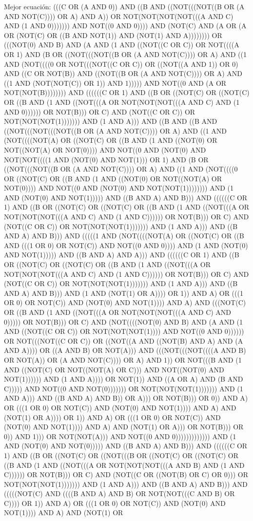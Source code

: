 Mejor ecuación: (((C OR (A AND 0)) AND ((B AND ((NOT(((NOT((B OR (A AND NOT(C)))) OR A) AND A)) OR NOT(NOT(NOT(NOT(((A AND C) AND (1 AND 0))))))) AND NOT((0 AND 0)))) AND (NOT(C) AND (A OR (A OR (NOT(C) OR ((B AND NOT(1)) AND (NOT(1) AND A)))))))) OR (((NOT(0) AND B) AND (A AND (1 AND ((NOT((C OR C)) OR NOT((((A OR 1) AND (B OR ((NOT(((NOT((B OR (A AND NOT(C)))) OR A) AND ((1 AND (NOT((((0 OR NOT(((NOT((C OR C)) OR ((NOT((A AND 1)) OR 0) AND ((C OR NOT(B)) AND ((NOT((B OR (A AND NOT(C)))) OR A) AND ((1 AND (NOT(NOT(C)) OR 1)) AND 1))))) AND NOT((0 AND (A OR NOT(NOT(B)))))))) AND ((((((C OR 1) AND ((B OR ((NOT(C) OR ((NOT(C) OR ((B AND (1 AND ((NOT(((A OR NOT(NOT(NOT(((A AND C) AND (1 AND 0)))))) OR NOT(B))) OR C) AND (NOT((C OR C)) OR NOT(NOT(NOT(1))))))) AND (1 AND A))) AND ((B AND ((B AND ((NOT(((NOT(((NOT((B OR (A AND NOT(C)))) OR A) AND ((1 AND (NOT((((NOT(A) OR ((NOT(C) OR ((B AND (1 AND ((NOT(0) OR NOT((NOT(A) OR NOT(0)))) AND NOT((0 AND (NOT(0) AND NOT(NOT((((1 AND (NOT(0) AND NOT(1))) OR 1) AND (B OR ((NOT(((NOT((B OR (A AND NOT(C)))) OR A) AND ((1 AND (NOT((((0 OR ((NOT(C) OR ((B AND (1 AND ((NOT(0) OR NOT((NOT(A) OR NOT(0)))) AND NOT((0 AND (NOT(0) AND NOT(NOT(1)))))))) AND (1 AND (NOT(0) AND NOT(1))))) AND ((B AND A) AND B))) AND ((((((C OR 1) AND ((B OR ((NOT(C) OR ((NOT(C) OR ((B AND (1 AND ((NOT(((A OR NOT(NOT(NOT(((A AND C) AND (1 AND C)))))) OR NOT(B))) OR C) AND (NOT((C OR C)) OR NOT(NOT(NOT(1))))))) AND (1 AND A))) AND ((B AND A) AND B))) AND (((((1 AND (NOT((((NOT(A) OR ((NOT(C) OR ((B AND (((1 OR 0) OR NOT(C)) AND NOT((0 AND 0)))) AND (1 AND (NOT(0) AND NOT(1))))) AND ((B AND A) AND A))) AND ((((((C OR 1) AND ((B OR ((NOT(C) OR ((NOT(C) OR ((B AND (1 AND ((NOT(((A OR NOT(NOT(NOT(((A AND C) AND (1 AND C)))))) OR NOT(B))) OR C) AND (NOT((C OR C)) OR NOT(NOT(NOT(1))))))) AND (1 AND A))) AND ((B AND A) AND B))) AND (1 AND (NOT(1) OR A)))) OR 1)) AND A) OR (((1 OR 0) OR NOT(C)) AND (NOT(0) AND NOT(1)))) AND A) AND (((NOT(C) OR ((B AND (1 AND ((NOT(((A OR NOT(NOT(NOT(((A AND C) AND 0))))) OR NOT(B))) OR C) AND (NOT((((NOT(0) AND B) AND (A AND (1 AND ((NOT((C OR C)) OR NOT(NOT(NOT(1)))) AND NOT((0 AND 0)))))) OR NOT(((NOT((C OR C)) OR ((NOT((A AND ((NOT(B) AND A) AND (A AND A)))) OR ((A AND B) OR NOT(A))) AND (((NOT(((NOT((((A AND B) OR NOT(A)) OR (A AND NOT(C)))) OR A) AND 1)) OR NOT(((B AND (1 AND ((NOT(C) OR NOT((NOT(A) OR C))) AND NOT((NOT(0) AND NOT(1)))))) AND (1 AND A)))) OR NOT(1)) AND ((A OR A) AND (B AND C))))) AND NOT((0 AND NOT(0))))))) OR NOT(NOT(NOT(1))))))) AND (1 AND A))) AND ((B AND A) AND B)) OR A))) OR NOT(B))) OR 0)) AND A) OR (((1 OR 0) OR NOT(C)) AND (NOT(0) AND NOT(1)))) AND A) AND (NOT(1) OR A)))) OR 1)) AND A) OR (((1 OR 0) OR NOT(C)) AND (NOT(0) AND NOT(1)))) AND A) AND (NOT(1) OR A))) OR NOT(B))) OR 0)) AND 1))) OR NOT(NOT(A))) AND NOT((0 AND 0))))))))))))) AND (1 AND (NOT(0) AND NOT(0))))) AND ((B AND A) AND B))) AND ((((((C OR 1) AND ((B OR ((NOT(C) OR ((NOT(((B OR ((NOT(C) OR ((NOT(C) OR ((B AND (1 AND ((NOT(((A OR NOT(NOT(NOT(((A AND B) AND (1 AND C)))))) OR NOT(B))) OR C) AND (NOT((C OR ((NOT(B) OR C) OR 0))) OR NOT(NOT(NOT(1))))))) AND (1 AND A))) AND ((B AND A) AND B))) AND (((((NOT(C) AND ((((B AND A) AND B) OR NOT(NOT(((C AND B) OR C)))) OR 1)) AND A) OR (((1 OR 0) OR NOT(C)) AND (NOT(0) AND NOT(1)))) AND A) AND (NOT(1) OR 